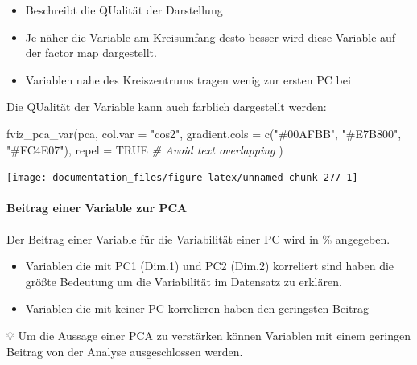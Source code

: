 \documentclass[
]{article}
\newenvironment{Shaded}{\begin{snugshade}}{\end{snugshade}}
\newcommand{\AttributeTok}[1]{\textcolor[rgb]{0.77,0.63,0.00}{#1}}
\newcommand{\CommentTok}[1]{\textcolor[rgb]{0.56,0.35,0.01}{\textit{#1}}}
\newcommand{\ConstantTok}[1]{\textcolor[rgb]{0.00,0.00,0.00}{#1}}
\newcommand{\FunctionTok}[1]{\textcolor[rgb]{0.00,0.00,0.00}{#1}}
\newcommand{\NormalTok}[1]{#1}
\newcommand{\StringTok}[1]{\textcolor[rgb]{0.31,0.60,0.02}{#1}}
\providecommand{\tightlist}{%
  \setlength{\itemsep}{0pt}\setlength{\parskip}{0pt}}
\begin{document}
\begin{itemize}
\tightlist
\item
  Beschreibt die QUalität der Darstellung
\item
  Je näher die Variable am Kreisumfang desto besser wird diese Variable auf der factor map dargestellt.
\item
  Variablen nahe des Kreiszentrums tragen wenig zur ersten PC bei
\end{itemize}

Die QUalität der Variable kann auch farblich dargestellt werden:

\begin{Shaded}
\begin{Highlighting}[]

\FunctionTok{fviz\_pca\_var}\NormalTok{(pca, }\AttributeTok{col.var =} \StringTok{"cos2"}\NormalTok{, }\AttributeTok{gradient.cols =} \FunctionTok{c}\NormalTok{(}\StringTok{"\#00AFBB"}\NormalTok{, }\StringTok{"\#E7B800"}\NormalTok{, }\StringTok{"\#FC4E07"}\NormalTok{), }
             \AttributeTok{repel =} \ConstantTok{TRUE} \CommentTok{\# Avoid text overlapping}
\NormalTok{             )}
\end{Highlighting}
\end{Shaded}

\begin{center}\texttt{[image: documentation\_files/figure-latex/unnamed-chunk-277-1]} \end{center}

\hypertarget{beitrag-einer-variable-zur-pca}{%
\paragraph{Beitrag einer Variable zur PCA}\label{beitrag-einer-variable-zur-pca}}

Der Beitrag einer Variable für die Variabilität einer PC wird in \% angegeben.

\begin{itemize}
\tightlist
\item
  Variablen die mit PC1 (Dim.1) und PC2 (Dim.2) korreliert sind haben die größte Bedeutung um die Variabilität im Datensatz zu erklären.
\item
  Variablen die mit keiner PC korrelieren haben den geringsten Beitrag
\end{itemize}

💡 Um die Aussage einer PCA zu verstärken können Variablen mit einem geringen Beitrag von der Analyse ausgeschlossen werden.
\end{document}
